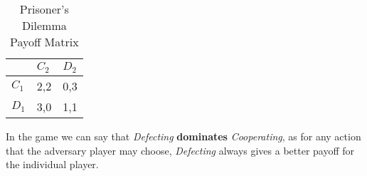 \begin{table}[]
	\centering
	\begin{tabular}{l|l|l|}
		\cline{2-3}
		& $C_2$   & $D_2$   \\ \hline
		\multicolumn{1}{|l|}{$C_1$} & 2,2 & 0,3 \\ \hline
		\multicolumn{1}{|l|}{$D_1$} & 3,0 & 1,1 \\ \hline
	\end{tabular}
	\caption{Prisoner's Dilemma Payoff Matrix}
	\label{PrisonerDilemaPayoffMatrix}
\end{table}	

In the game we can say that \textit{Defecting} \textbf{dominates} \textit{Cooperating}, as for any action that the adversary player may choose, \textit{Defecting} always gives a better payoff for the individual player\cite{Nash1951}.

